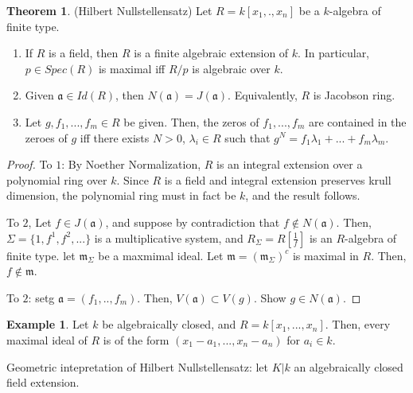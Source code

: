 \documentclass{article}
\theoremstyle{definition}
\newtheorem{theorem}{Theorem}[section]
\theoremstyle{definition}
\theoremstyle{definition}
\theoremstyle{definition}
\theoremstyle{definition}
\theoremstyle{definition}
\theoremstyle{definition}
\newtheorem{example}{Example}[section]
\begin{document}
\begin{tcolorbox}[colback=red!5!white,colframe=red!30!white]
\begin{theorem}
(Hilbert Nullstellensatz) Let $R=k[x_1,.,x_n]$ be a $k$-algebra of finite type. 
\begin{enumerate}
    \item If $R$ is a field, then $R$ is a finite algebraic extension of $k$. In particular, $p\in Spec(R)$ is maximal iff $R/p$ is algebraic over $k$. 
    \item Given $\mathfrak{a}\in Id(R)$, then $N(\mathfrak{a})=J(\mathfrak{a})$. Equivalently, $R$ is Jacobson ring.
    \item Let $g, f_1,...,f_m\in R$ be given. Then, the zeros of $f_1,...,f_m$ are contained in the zeroes of $g$ iff there exists $N>0$, $\lambda_i\in R$ such that $g^N=f_1\lambda_1+...+f_m\lambda_m$. 
\end{enumerate}
\end{theorem}
\end{tcolorbox}
\begin{proof}
    To $1$: By Noether Normalization, $R$ is an integral extension over a polynomial ring over $k$. Since $R$ is a field and integral extension preserves krull dimension, the polynomial ring must in fact be $k$, and the result follows.

    To $2$, Let $f\in J(\mathfrak{a})$, and suppose by contradiction that $f\not\in N(\mathfrak{a})$. Then, $\Sigma=\{1,f^1,f^2,...\}$ is a multiplicative system, and $R_{\Sigma}=R[\frac{1}{f}]$ is an $R$-algebra of finite type. let $\mathfrak{m}_{\Sigma}$ be a maxmimal ideal. Let $\mathfrak{m}=(\mathfrak{m}_{\Sigma})^{c}$ is maximal in $R$. Then, $f\not \in \mathfrak{m}$. 

    To $2$: setg $\mathfrak{a}=(f_1,..,f_m)$. Then, $V(\mathfrak{a})\subset V(g)$. Show $g\in N(\mathfrak{a})$. 
\end{proof}
\begin{tcolorbox}[colback=yellow!5!white,colframe=yellow!30!white]
    \begin{example}
    Let $k$ be algebraically closed, and $R=k[x_1,...,x_n]$. Then, every maximal ideal of $R$ is of the form $(x_1-a_1,...,x_n-a_n)$ for $a_i\in k$. 
    \end{example}
    \end{tcolorbox}
    
    
Geometric intepretation of Hilbert Nullstellensatz: let $K|k$ an algebraically closed field extension. 
\end{document}
